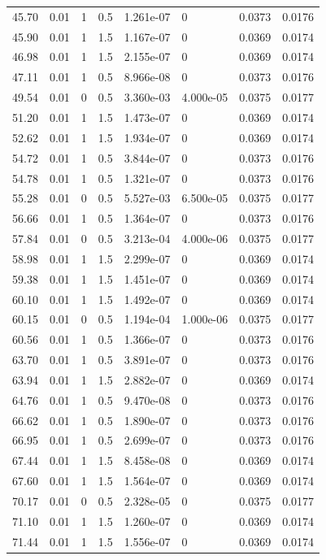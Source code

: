 \documentclass[preview]{standalone}
\begin{document}
{{\begin{tabular}{L{1.2cm}C{1.2cm} C{0.3cm}C{0.5cm} C{1.4cm}C{1.4cm} C{1.4cm}C{1.4cm}}
  45.70  &  0.01  & 1     & 0.5 &  1.261e-07  & 0  & 0.0373 &  0.0176   \\ 
  45.90  &  0.01  & 1     & 1.5 &  1.167e-07  & 0  & 0.0369 &  0.0174   \\ 
  46.98  &  0.01  & 1     & 1.5 &  2.155e-07  & 0  & 0.0369 &  0.0174   \\ 
  47.11  &  0.01  & 1     & 0.5 &  8.966e-08  & 0  & 0.0373 &  0.0176   \\ 
  49.54  &  0.01  & 0     & 0.5 &  3.360e-03  & 4.000e-05  & 0.0375 &  0.0177   \\ 
  51.20  &  0.01  & 1     & 1.5 &  1.473e-07  & 0  & 0.0369 &  0.0174   \\ 
  52.62  &  0.01  & 1     & 1.5 &  1.934e-07  & 0  & 0.0369 &  0.0174   \\ 
  54.72  &  0.01  & 1     & 0.5 &  3.844e-07  & 0  & 0.0373 &  0.0176   \\ 
  54.78  &  0.01  & 1     & 0.5 &  1.321e-07  & 0  & 0.0373 &  0.0176   \\ 
  55.28  &  0.01  & 0     & 0.5 &  5.527e-03  & 6.500e-05  & 0.0375 &  0.0177   \\ 
  56.66  &  0.01  & 1     & 0.5 &  1.364e-07  & 0  & 0.0373 &  0.0176   \\ 
  57.84  &  0.01  & 0     & 0.5 &  3.213e-04  & 4.000e-06  & 0.0375 &  0.0177   \\ 
  58.98  &  0.01  & 1     & 1.5 &  2.299e-07  & 0  & 0.0369 &  0.0174   \\ 
  59.38  &  0.01  & 1     & 1.5 &  1.451e-07  & 0  & 0.0369 &  0.0174   \\ 
  60.10  &  0.01  & 1     & 1.5 &  1.492e-07  & 0  & 0.0369 &  0.0174   \\ 
  60.15  &  0.01  & 0     & 0.5 &  1.194e-04  & 1.000e-06  & 0.0375 &  0.0177   \\ 
  60.56  &  0.01  & 1     & 0.5 &  1.366e-07  & 0  & 0.0373 &  0.0176   \\ 
  63.70  &  0.01  & 1     & 0.5 &  3.891e-07  & 0  & 0.0373 &  0.0176   \\ 
  63.94  &  0.01  & 1     & 1.5 &  2.882e-07  & 0  & 0.0369 &  0.0174   \\ 
  64.76  &  0.01  & 1     & 0.5 &  9.470e-08  & 0  & 0.0373 &  0.0176   \\ 
  66.62  &  0.01  & 1     & 0.5 &  1.890e-07  & 0  & 0.0373 &  0.0176   \\ 
  66.95  &  0.01  & 1     & 0.5 &  2.699e-07  & 0  & 0.0373 &  0.0176   \\ 
  67.44  &  0.01  & 1     & 1.5 &  8.458e-08  & 0  & 0.0369 &  0.0174   \\ 
  67.60  &  0.01  & 1     & 1.5 &  1.564e-07  & 0  & 0.0369 &  0.0174   \\ 
  70.17  &  0.01  & 0     & 0.5 &  2.328e-05  & 0  & 0.0375 &  0.0177   \\ 
  71.10  &  0.01  & 1     & 1.5 &  1.260e-07  & 0  & 0.0369 &  0.0174   \\ 
  71.44  &  0.01  & 1     & 1.5 &  1.556e-07  & 0  & 0.0369 &  0.0174   \\ 
\hline 
\end{tabular} 

}}
\end{document}
